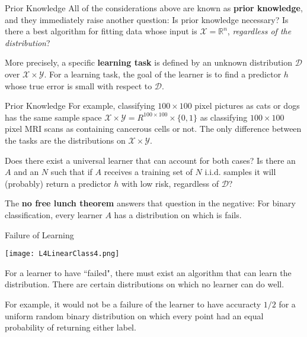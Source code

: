 \documentclass[10pt, table, dvipsnames,handout]{beamer}
\newcommand{\cD}{\ensuremath{\mathcal{D}}}
\newcommand{\cX}{\ensuremath{\mathcal{X}}}
\newcommand{\cY}{\ensuremath{\mathcal{Y}}}
\newcommand{\bR}{\ensuremath{\mathbb{R}}}
\begin{document}
\begin{frame}[fragile]{Prior Knowledge}
All of the considerations above are known as \textbf{prior knowledge}, and they immediately raise another question: Is prior knowledge necessary? Is there a best algorithm for fitting data whose input is $\cX = \bR^n$, \textit{regardless of the distribution}?\pause

More precisely, a specific \textbf{learning task} is defined by an unknown distribution $\cD$ over $\cX\times \cY$. For a learning task, the goal of the learner is to find a predictor $h$ whose true error is small with respect to $\mathcal{D}$.
\end{frame}




\begin{frame}[fragile]{Prior Knowledge}
For example, classifying $100\times 100$ pixel pictures as cats or dogs has the same sample space $\cX\times\cY = R^{100\times 100}\times \{0,1\}$ as classifying $100\times 100$ pixel MRI scans as containing cancerous cells or not. The only difference between the tasks are the distributions on $\cX\times \cY$.  \pause

Does there exist a universal learner that can account for both cases? Is there an $A$ and an $N$ such that if $A$ receives a training set of $N$ i.i.d. samples it will (probably) return a predictor $h$ with low risk, regardless of $\cD$?\pause

The \textbf{no free lunch theorem} answers that question in the negative: For binary classification, every learner $A$ has a distribution on which is fails.

\end{frame}




\begin{frame}[fragile]{Failure of Learning}
  \begin{minipage}[t][0.5\textheight][t]{\textwidth}
	  \centering \texttt{[image: L4LinearClass4.png]}
  \end{minipage}
  \vfill
  \begin{minipage}[t][0.5\textheight][t]{\textwidth}
For a learner to have ``failed", there must exist an algorithm that can learn the distribution. There are certain distributions on which no learner can do well. \pause

For example, it would not be a failure of the learner to have accuracty $1/2$ for a uniform random binary distribution on which every point had an equal probability of returning either label.  

\end{minipage}
\end{frame}
\end{document}
